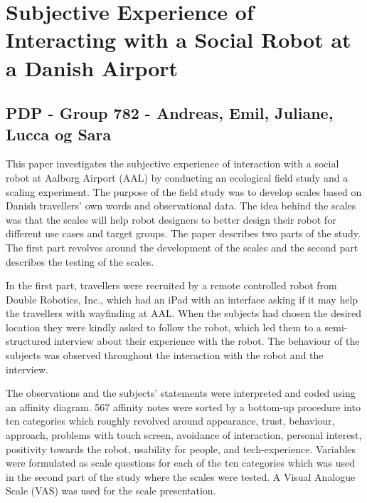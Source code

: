 


\chapter*{Subjective Experience of Interacting with a Social Robot at a Danish Airport}
\label{ExtendedAbstract}
\section*{PDP - Group 782 - Andreas, Emil, Juliane, Lucca og Sara}

This paper investigates the subjective experience of interaction with a social robot at Aalborg Airport (AAL) by conducting an ecological field study and a scaling experiment. The purpose of the field study was to develop scales based on Danish travellers' own words and observational data. The idea behind the scales was that the scales will help robot designers to better design their robot for different use cases and target groups. The paper describes two parts of the study. The first part revolves around the development of the scales and the second part describes the testing of the scales.

In the first part, travellers were recruited by a remote controlled robot from Double Robotics, Inc., which had an iPad with an interface asking if it may help the travellers with wayfinding at AAL. When the subjects had chosen the desired location they were kindly asked to follow the robot, which led them to a semi-structured interview about their experience with the robot. The behaviour of the subjects was observed throughout the interaction with the robot and the interview. 

The observations and the subjects' statements were interpreted and coded using an affinity diagram. 567 affinity notes were sorted by a bottom-up procedure into ten categories which roughly revolved around appearance, trust, behaviour, approach, problems with touch screen, avoidance of interaction, personal interest, positivity towards the robot, usability for people, and tech-experience. Variables were formulated as scale questions for each of the ten categories which was used in the second part of the study where the scales were tested. A Visual Analogue Scale (VAS) was used for the scale presentation.

